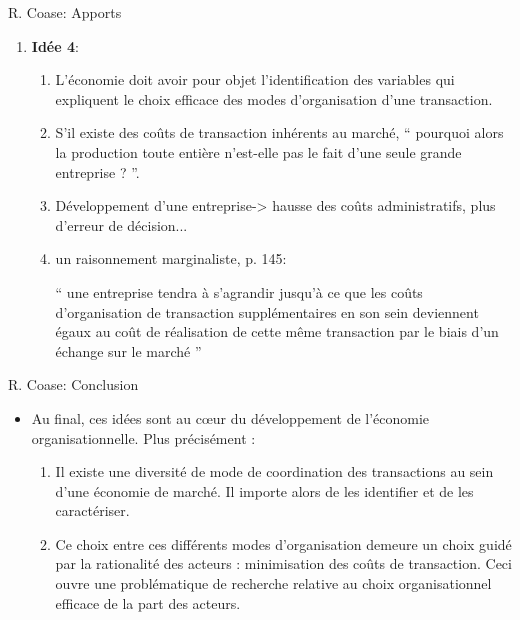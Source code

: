 \begin{frame}[allowframebreaks]{R. Coase: Apports}
\begin{itemize}
\begin{enumerate}[$\star$]
\begin{enumerate}[$\star$]
            \item Coût de découverte du prix adéquat
            \item Coût de négociation et de conclusion des contrats 
            \item Coût d’adaptation des contrats de long terme.
         \end{enumerate}
         \framebreak
         \item \textbf{Idée 4}:
         \begin{enumerate}[$\star$]
            \item L’économie doit avoir pour objet l’identification des variables qui 
            expliquent le choix efficace des modes d’organisation d’une transaction.
            \item S’il existe des coûts de transaction inhérents au marché, “ 
            pourquoi alors la production toute entière n’est-elle 
            pas le fait d’une seule grande entreprise ? ”.
           \item Développement d’une entreprise-> hausse des coûts administratifs,
            plus d’erreur de décision...
            \item un raisonnement marginaliste, p. 145:
            \begin{mdframed}
            “ une entreprise tendra à s’agrandir jusqu’à 
            ce que les coûts d’organisation de transaction 
            supplémentaires en son sein deviennent égaux au coût de 
            réalisation de cette même transaction par le biais d’un échange sur le marché ”
            \end{mdframed}
         \end{enumerate}
        \end{enumerate}
    \end{itemize}
    \end{frame}
    \begin{frame}[allowframebreaks]{R. Coase: Conclusion}
        \begin{itemize}
            \item Au final, ces idées sont au cœur du développement 
            de l’économie organisationnelle. Plus précisément :
            \begin{enumerate}[$\star$]
                \item Il existe une diversité de mode de coordination 
                des transactions au sein d’une économie de marché. 
                Il importe alors de les identifier et de les caractériser.
                \item Ce choix entre ces différents modes 
                d’organisation demeure un choix guidé par la rationalité des acteurs
                 : minimisation des coûts de transaction. Ceci ouvre une problématique 
                 de recherche relative au choix organisationnel efficace de la part des acteurs.
            \end{enumerate}
        \end{itemize}
    \end{frame}

